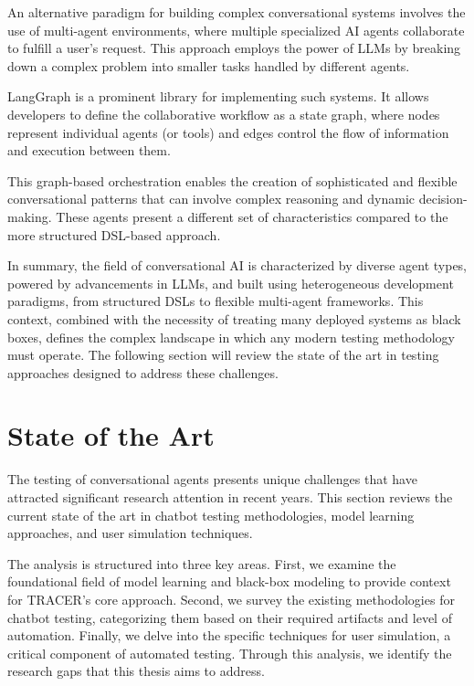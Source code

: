 An alternative paradigm for building complex conversational systems
involves the use of multi-agent environments,
where multiple specialized \ac{AI} agents collaborate to fulfill a user's request.
This approach employs the power of \acp{LLM}
by breaking down a complex problem into smaller tasks handled by different agents.

LangGraph \autocite{LangGraph} is a prominent library for implementing such systems.
It allows developers to define the collaborative workflow as a state graph,
where nodes represent individual agents (or tools)
and edges control the flow of information and execution between them.

This graph-based orchestration enables the creation of
sophisticated and flexible conversational patterns
that can involve complex reasoning and dynamic decision-making.
These agents present a different set of characteristics
compared to the more structured \ac{DSL}-based approach.

\indent

In summary,
the field of conversational \ac{AI} is characterized by diverse agent types,
powered by advancements in \acp{LLM},
and built using heterogeneous development paradigms,
from structured \acp{DSL} to flexible multi-agent frameworks.
This context, combined with the necessity of treating many deployed systems as black boxes,
defines the complex landscape in which any modern testing methodology must operate.
The following section will review the state of the art in testing approaches designed to address these challenges.

\section{State of the Art}\label{sec:sota}

The testing of conversational agents presents unique challenges
that have attracted significant research attention in recent years.
This section reviews the current state of the art in
chatbot testing methodologies, model learning approaches, and user simulation techniques.

The analysis is structured into three key areas.
First, we examine the foundational field of model learning
and black-box modeling to provide context for TRACER's core approach.
Second, we survey the existing methodologies for chatbot testing,
categorizing them based on their required artifacts and level of automation.
Finally, we delve into the specific techniques for user simulation,
a critical component of automated testing.
Through this analysis, we identify the research gaps that this thesis aims to address.

